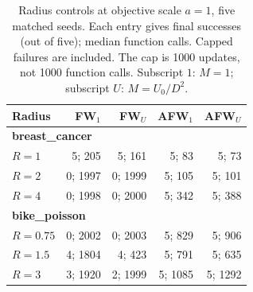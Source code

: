 \begin{table}[htbp]
\centering\small
\caption{Radius controls at objective scale $a=1$, five matched seeds. Each entry gives final successes (out of five); median function calls. Capped failures are included. The cap is 1000 updates, not 1000 function calls. Subscript $1$: $M=1$; subscript $U$: $M=U_0/D^2$.}
\label{tab:robustness}
\begin{tabular}{lrrrr}
\hline
Radius & FW$_1$ & FW$_U$ & AFW$_1$ & AFW$_U$ \\
\hline
\multicolumn{5}{l}{\textbf{breast\_cancer}} \\
$R=1$ & 5; 205 & 5; 161 & 5; 83 & 5; 73 \\
$R=2$ & 0; 1997 & 0; 1999 & 5; 105 & 5; 101 \\
$R=4$ & 0; 1998 & 0; 2000 & 5; 342 & 5; 388 \\
\hline
\multicolumn{5}{l}{\textbf{bike\_poisson}} \\
$R=0.75$ & 0; 2002 & 0; 2003 & 5; 829 & 5; 906 \\
$R=1.5$ & 4; 1804 & 4; 423 & 5; 791 & 5; 635 \\
$R=3$ & 3; 1920 & 2; 1999 & 5; 1085 & 5; 1292 \\
\hline
\end{tabular}
\end{table}
